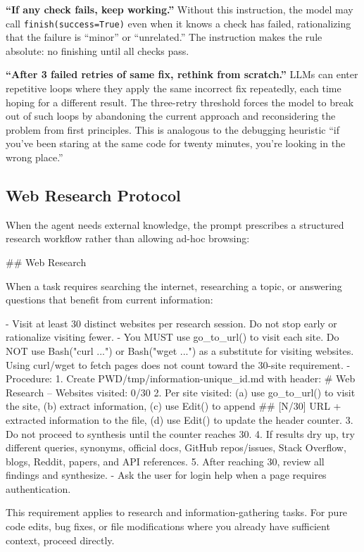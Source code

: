 \documentclass{article}
\begin{document}
\textbf{``If any check fails, keep working.''}  Without this instruction, the model may call \texttt{finish(success=True)} even when it knows a check has failed, rationalizing that the failure is ``minor'' or ``unrelated.''  The instruction makes the rule absolute: no finishing until all checks pass.

\textbf{``After 3 failed retries of same fix, rethink from scratch.''}  LLMs can enter repetitive loops where they apply the same incorrect fix repeatedly, each time hoping for a different result.  The three-retry threshold forces the model to break out of such loops by abandoning the current approach and reconsidering the problem from first principles.  This is analogous to the debugging heuristic ``if you've been staring at the same code for twenty minutes, you're looking in the wrong place.''

\subsection{Web Research Protocol}

When the agent needs external knowledge, the prompt prescribes a structured research workflow rather than allowing ad-hoc browsing:

\begin{prompt}
## Web Research

When a task requires searching the internet, researching
a topic, or answering questions that benefit from current
information:

- Visit at least 30 distinct websites per research
  session. Do not stop early or rationalize visiting
  fewer.
- You MUST use go_to_url() to visit each site. Do NOT
  use Bash("curl ...") or Bash("wget ...") as a
  substitute for visiting websites. Using curl/wget to
  fetch pages does not count toward the 30-site
  requirement.
- Procedure:
  1. Create PWD/tmp/information-{unique_id}.md with
     header: # Web Research -- Websites visited: 0/30
  2. Per site visited: (a) use go_to_url() to visit the
     site, (b) extract information, (c) use Edit() to
     append ## [N/30] URL + extracted information to the
     file, (d) use Edit() to update the header counter.
  3. Do not proceed to synthesis until the counter
     reaches 30.
  4. If results dry up, try different queries, synonyms,
     official docs, GitHub repos/issues, Stack Overflow,
     blogs, Reddit, papers, and API references.
  5. After reaching 30, review all findings and
     synthesize.
- Ask the user for login help when a page requires
  authentication.

This requirement applies to research and
information-gathering tasks. For pure code edits, bug
fixes, or file modifications where you already have
sufficient context, proceed directly.
\end{prompt}
\end{document}
